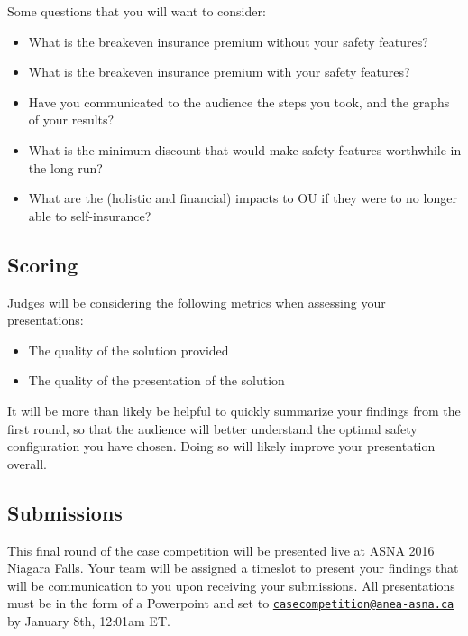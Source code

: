 \documentclass[12pt]{article}
\begin{document}
Some questions that you will want to consider:

\begin{itemize}
\item What is the breakeven insurance premium without your safety features?
\item What is the breakeven insurance premium with your safety features?
\item Have you communicated to the audience the steps you took, and the graphs of your results?
\item What is the minimum discount that would make safety features worthwhile in the long run?
\item What are the (holistic and financial) impacts to OU if they were to no longer able to self-insurance?
\end{itemize}

\subsection{Scoring}

Judges will be considering the following metrics when assessing your presentations:

\begin{itemize}
\item The quality of the solution provided
\item The quality of the presentation of the solution
\end{itemize}

It will be more than likely be helpful to quickly summarize your findings from the first round, so that the audience will better understand the optimal safety configuration you have chosen. Doing so will likely improve your presentation overall.

\subsection{Submissions}

This final round of the case competition will be presented live at ASNA 2016 Niagara Falls. Your team will be assigned a timeslot to present your findings that will be communication to you upon receiving your submissions. All presentations must be in the form of a Powerpoint and set to \href{mailto:casecompetition@anea-asna.ca}{\texttt{casecompetition@anea-asna.ca}} by January 8th, 12:01am ET.
\end{document}
